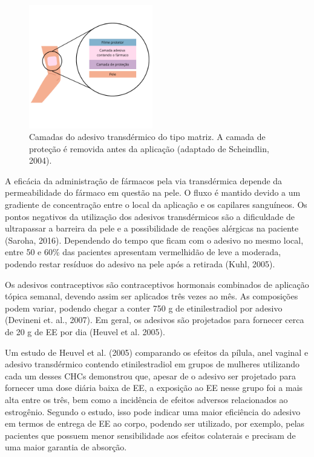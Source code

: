 \begin{figure}[!htb]
    \centering
        \includegraphics[width=0.48\textwidth]{figuras/adesivo.png}
        \caption[Camadas do adesivo transdérmico do tipo matriz]{Camadas do adesivo transdérmico do tipo matriz. A camada de proteção é removida antes da aplicação (adaptado de Scheindlin, 2004).}
    \label{fig:patch}
\end{figure}

A eficácia da administração de fármacos pela via transdérmica depende da permeabilidade do fármaco em questão na pele. O fluxo é mantido devido a um gradiente de concentração entre o local da aplicação e os capilares sanguíneos. Os pontos negativos da utilização dos adesivos transdérmicos são a dificuldade de ultrapassar a barreira da pele e a possibilidade de reações alérgicas na paciente (Saroha, 2016). Dependendo do tempo que ficam com o adesivo no mesmo local, entre 50 e 60\% das pacientes apresentam vermelhidão de leve a moderada, podendo restar resíduos do adesivo na pele após a retirada (Kuhl, 2005).

Os adesivos contraceptivos são contraceptivos hormonais combinados de aplicação tópica semanal, devendo assim ser aplicados três vezes ao mês. As composições podem variar, podendo chegar a conter 750 \textmu g de etinilestradiol por adesivo (Devineni et. al., 2007). Em geral, os adesivos são projetados para fornecer cerca de 20 \textmu g de EE por dia (Heuvel et al. 2005).

Um estudo de Heuvel et al. (2005) comparando os efeitos da pílula, anel vaginal e adesivo transdérmico contendo etinilestradiol em grupos de mulheres utilizando cada um desses CHCs demonstrou que, apesar de o adesivo ser projetado para fornecer uma dose diária baixa de EE, a exposição ao EE nesse grupo foi a mais alta entre os três, bem como a incidência de efeitos adversos relacionados ao estrogênio. Segundo o estudo, isso pode indicar uma maior eficiência do adesivo em termos de entrega de EE ao corpo, podendo ser utilizado, por exemplo, pelas pacientes que possuem menor sensibilidade aos efeitos colaterais e precisam de uma maior garantia de absorção. 


